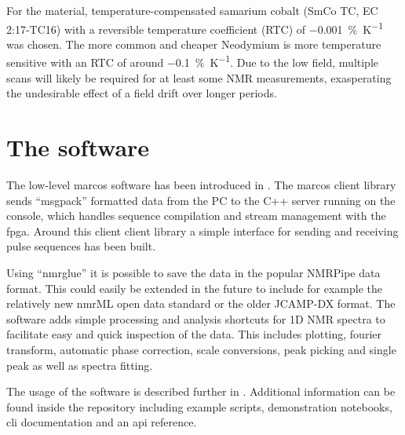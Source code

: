 For the material, temperature-compensated samarium cobalt (SmCo TC, EC 2:17-TC16) with a reversible temperature coefficient (RTC) of \qty{-0.001}{\%\per\kelvin} was chosen. The more common and cheaper Neodymium is more temperature sensitive with an RTC of around \qty{-0.1}{\%\per\kelvin}. Due to the low field, multiple scans will likely be required for at least some NMR measurements, exasperating the undesirable effect of a field drift over longer periods.

\section{The software}
The low-level \gls{marcos} software has been introduced in . The \gls{marcos} client library sends \enquote{msgpack} formatted data from the PC to the C++ server running on the console, which handles sequence compilation and stream management with the \acrshort{fpga}. Around this client client library a simple interface for sending and receiving pulse sequences has been built.

Using \enquote{nmrglue}  it is possible to save the data in the popular NMRPipe  data format. This could easily be extended in the future to include for example the relatively new nmrML open data standard or the older JCAMP-DX  format. The software adds simple processing and analysis shortcuts for 1D NMR spectra to facilitate easy and quick inspection of the data. This includes plotting, fourier transform, automatic phase correction, scale conversions, peak picking and single peak as well as spectra fitting.

The usage of the software is described further in . Additional information can be found inside the repository including example scripts, demonstration notebooks, \acrshort{cli} documentation and an \acrshort{api} reference.
